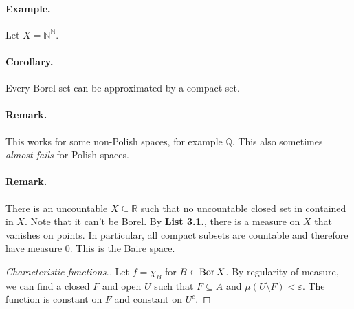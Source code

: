 \paragraph{Example.} Let \( X = \mathbb{N}^{ \mathbb{N} } \).

\paragraph{Corollary.} Every Borel set can be approximated by a compact set.

\paragraph{Remark.} This works for some non-Polish spaces, for example \( \mathbb{Q} \). This also sometimes \emph{almost fails} for Polish spaces.

\paragraph{Remark.} There is an uncountable \( X \subseteq \mathbb{R} \) such that no uncountable closed set in contained in \( X \). Note that it can't be Borel. By \textbf{List 3.1.}, there is a measure on \( X \) that vanishes on points. In particular, all compact subsets are countable and therefore have measure 0. This is the Baire space.



\begin{proof}[Characteristic functions.]
Let \( f = \chi_B \) for \( B \in \operatorname{Bor} X \). By regularity of measure, we can find a closed \( F \) and open \( U \) such that \( F \subseteq A \) and \( \mu(U \setminus F) < \varepsilon \). The function is constant on \( F \) and constant on \( U^c \).
\end{proof}

